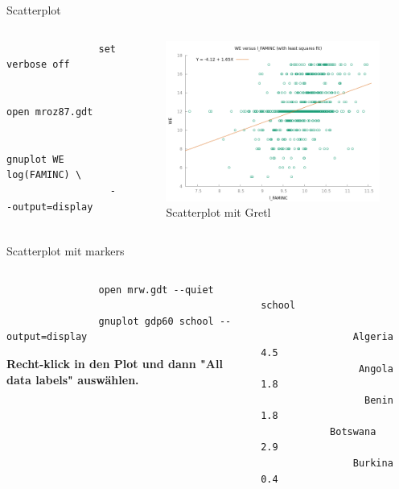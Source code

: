 \documentclass{beamer}[11pt]
\begin{document}
\begin{frame}[fragile]{Scatterplot}
	\begin{columns}[T] %
		\small
		\begin{column}{.4\textwidth}
			\begin{verbatim}
				set verbose off

				open mroz87.gdt

				gnuplot WE log(FAMINC) \
				  --output=display
			\end{verbatim}
		\end{column}

		\begin{column}{.6\textwidth}
			\begin{figure}
				\includegraphics[width=1.0\textwidth]{../figures/scatterplot.png}
				\caption{Scatterplot mit Gretl}
			\end{figure}
	  \end{column}
	\end{columns}
\end{frame}


\begin{frame}[fragile]{Scatterplot mit markers}
	\begin{columns}[T] %
		\small
		\begin{column}{.6\textwidth}
			\begin{verbatim}
				open mrw.gdt --quiet

				gnuplot gdp60 school --output=display
			\end{verbatim}
			\textbf{Recht-klick in den Plot und dann "All data labels" auswählen.}
		\end{column}

		\begin{column}{.4\textwidth}
			\begin{verbatim}
				                 school

				Algeria          4.5
				 Angola          1.8
				  Benin          1.8
			Botswana          2.9
				Burkina          0.4
			\end{verbatim}
	  \end{column}
	\end{columns}
\end{frame}
\end{document}
